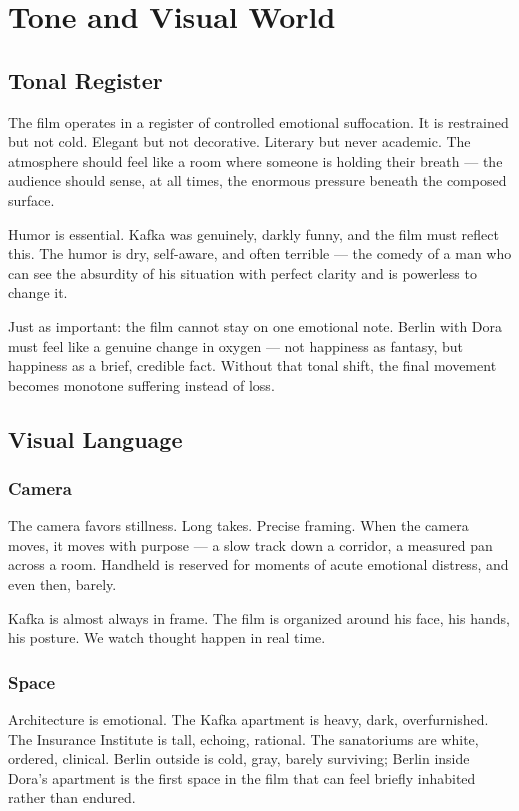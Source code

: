 
\section{Tone and Visual World}

\subsection{Tonal Register}

The film operates in a register of controlled emotional suffocation. It is restrained but not cold. Elegant but not decorative. Literary but never academic. The atmosphere should feel like a room where someone is holding their breath --- the audience should sense, at all times, the enormous pressure beneath the composed surface.

Humor is essential. Kafka was genuinely, darkly funny, and the film must reflect this. The humor is dry, self-aware, and often terrible --- the comedy of a man who can see the absurdity of his situation with perfect clarity and is powerless to change it.

Just as important: the film cannot stay on one emotional note. Berlin with Dora must feel like a genuine change in oxygen --- not happiness as fantasy, but happiness as a brief, credible fact. Without that tonal shift, the final movement becomes monotone suffering instead of loss.

\subsection{Visual Language}

\subsubsection{Camera}
The camera favors stillness. Long takes. Precise framing. When the camera moves, it moves with purpose --- a slow track down a corridor, a measured pan across a room. Handheld is reserved for moments of acute emotional distress, and even then, barely.

Kafka is almost always in frame. The film is organized around his face, his hands, his posture. We watch thought happen in real time.

\subsubsection{Space}
Architecture is emotional. The Kafka apartment is heavy, dark, overfurnished. The Insurance Institute is tall, echoing, rational. The sanatoriums are white, ordered, clinical. Berlin outside is cold, gray, barely surviving; Berlin inside Dora's apartment is the first space in the film that can feel briefly inhabited rather than endured.

